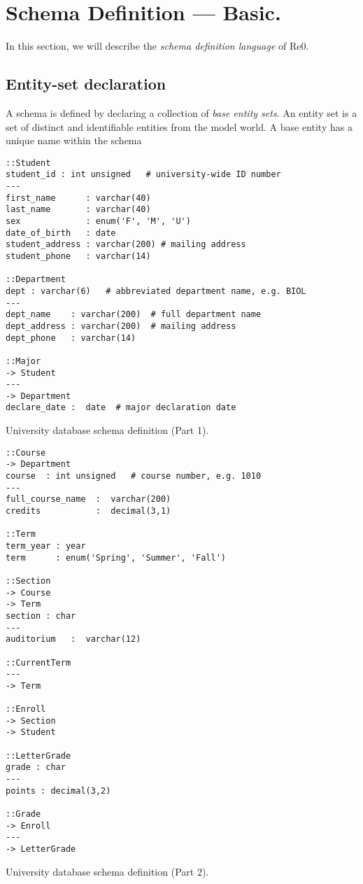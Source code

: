 \documentclass[letter,twocolumn,11pt]{article}
\begin{document}
\section{Schema Definition --- Basic.}
In this section, we will describe the \emph{schema definition language} of Re0.

\subsection{Entity-set declaration}
A schema is defined by declaring a collection of \emph{base entity sets}.
An entity set is a set of distinct and identifiable entities from the model world. 
A base entity has a unique name within the schema 

\begin{lstfloat*}
\begin{lstlisting}[language=dj]
::Student     
student_id : int unsigned   # university-wide ID number 
---
first_name      : varchar(40)
last_name       : varchar(40)
sex             : enum('F', 'M', 'U')
date_of_birth   : date
student_address : varchar(200) # mailing address
student_phone   : varchar(14) 

::Department 
dept : varchar(6)   # abbreviated department name, e.g. BIOL
---
dept_name    : varchar(200)  # full department name
dept_address : varchar(200)  # mailing address
dept_phone   : varchar(14)  

::Major
-> Student
---
-> Department
declare_date :  date  # major declaration date 
\end{lstlisting}
\caption{University database schema definition (Part 1).}
\end{lstfloat*}

\begin{lstfloat*}
\begin{lstlisting}[language=dj]
::Course     
-> Department
course  : int unsigned   # course number, e.g. 1010
---
full_course_name  :  varchar(200)
credits           :  decimal(3,1)

::Term
term_year : year 
term      : enum('Spring', 'Summer', 'Fall')

::Section 
-> Course
-> Term 
section : char    
---
auditorium   :  varchar(12)

::CurrentTerm
---
-> Term

::Enroll
-> Section
-> Student 

::LetterGrade
grade : char
---
points : decimal(3,2)

::Grade 
-> Enroll
---
-> LetterGrade

\end{lstlisting}
\caption{University database schema definition (Part 2).}
\end{lstfloat*}
\end{document}
